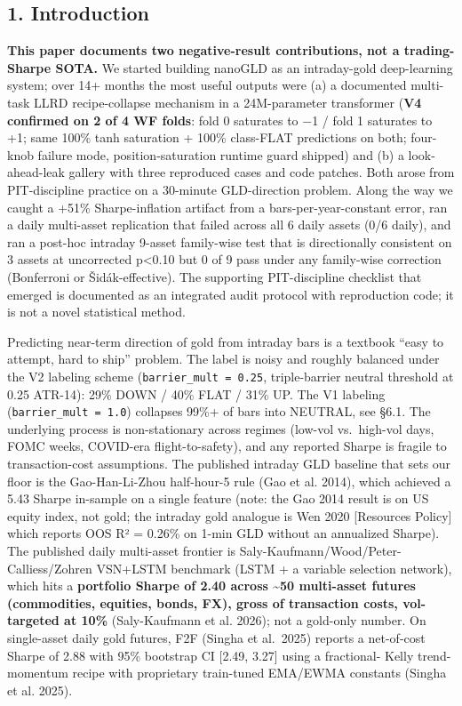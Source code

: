 \documentclass[
]{article}
\begin{document}
\subsection{1. Introduction}\label{introduction}

\textbf{This paper documents two negative-result contributions, not a
trading-Sharpe SOTA.} We started building nanoGLD as an intraday-gold
deep-learning system; over 14+ months the most useful outputs were (a) a
documented multi-task LLRD recipe-collapse mechanism in a 24M-parameter
transformer (\textbf{V4 confirmed on 2 of 4 WF folds}: fold 0 saturates
to −1 / fold 1 saturates to +1; same 100\% tanh saturation + 100\%
class-FLAT predictions on both; four-knob failure mode,
position-saturation runtime guard shipped) and (b) a look-ahead-leak
gallery with three reproduced cases and code patches. Both arose from
PIT-discipline practice on a 30-minute GLD-direction problem. Along the
way we caught a +51\% Sharpe-inflation artifact from a
bars-per-year-constant error, ran a daily multi-asset replication that
failed across all 6 daily assets (0/6 daily), and ran a post-hoc
intraday 9-asset family-wise test that is directionally consistent on 3
assets at uncorrected p\textless0.10 but 0 of 9 pass under any
family-wise correction (Bonferroni or Šidák-effective). The supporting
PIT-discipline checklist that emerged is documented as an integrated
audit protocol with reproduction code; it is not a novel statistical
method.

Predicting near-term direction of gold from intraday bars is a textbook
``easy to attempt, hard to ship'' problem. The label is noisy and
roughly balanced under the V2 labeling scheme
(\texttt{barrier\_mult\ =\ 0.25}, triple-barrier neutral threshold at
0.25 ATR-14): 29\% DOWN / 40\% FLAT / 31\% UP. The V1 labeling
(\texttt{barrier\_mult\ =\ 1.0}) collapses 99\%+ of bars into NEUTRAL,
see §6.1. The underlying process is non-stationary across regimes
(low-vol vs.~high-vol days, FOMC weeks, COVID-era flight-to-safety), and
any reported Sharpe is fragile to transaction-cost assumptions. The
published intraday GLD baseline that sets our floor is the
Gao-Han-Li-Zhou half-hour-5 rule (Gao et al. 2014), which achieved a
5.43 Sharpe in-sample on a single feature (note: the Gao 2014 result is
on US equity index, not gold; the intraday gold analogue is Wen 2020
{[}Resources Policy{]} which reports OOS R² = 0.26\% on 1-min GLD
without an annualized Sharpe). The published daily multi-asset frontier
is Saly-Kaufmann/Wood/Peter-Calliess/Zohren VSN+LSTM benchmark (LSTM + a
variable selection network), which hits a \textbf{portfolio Sharpe of
2.40 across \textasciitilde50 multi-asset futures (commodities,
equities, bonds, FX), gross of transaction costs, vol-targeted at 10\%}
(Saly-Kaufmann et al. 2026); not a gold-only number. On single-asset
daily gold futures, F2F (Singha et al.~2025) reports a net-of-cost
Sharpe of 2.88 with 95\% bootstrap CI {[}2.49, 3.27{]} using a
fractional- Kelly trend-momentum recipe with proprietary train-tuned
EMA/EWMA constants (Singha et al. 2025).
\end{document}
